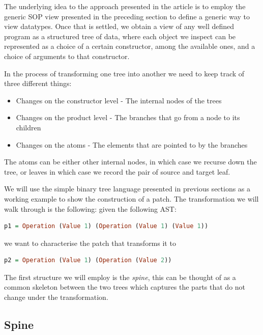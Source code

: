 \documentclass[11pt]{article}
\begin{document}
The underlying idea to the approach presented in the article is to employ
the generic SOP view presented in the preceding section to define a
generic way to view datatypes. Once that is settled, we obtain a view of
any well defined program as a structured tree of data, where each object
we inspect can be represented as a choice of a certain constructor,
among the available ones, and a choice of arguments to that constructor.

In the process of transforming one tree into another we need to keep track of three different things: 
\begin{itemize}
  \item Changes on the constructor level - The internal nodes of the trees
  \item Changes on the product level - The branches that go from a node to its children
  \item Changes on the atoms - The elements that are pointed to by the branches
\end{itemize}

The atoms can be either other internal nodes, in which case we recurse down the 
tree, or leaves in which case we record the pair of source and target leaf.

We will use the simple binary tree language presented in previous sections as a 
working example to show the construction of a patch. The transformation we will walk through is the following:
given the following AST:
\begin{lstlisting}[language=haskell]
p1 = Operation (Value 1) (Operation (Value 1) (Value 1))
\end{lstlisting}
we want to characterise the patch that transforms it to 
\begin{lstlisting}[language=haskell]
p2 = Operation (Value 1) (Operation (Value 2))
\end{lstlisting}

The first structure we will employ is the \emph{spine}, this can be thought of as a common skeleton between 
the two trees which captures the parts that do not change under the transformation.

\subsection{Spine}\label{spine}
\end{document}
